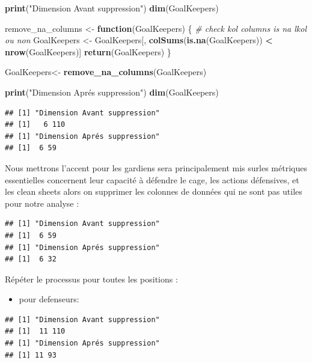 \documentclass[
  6pt,
]{article}
\newenvironment{Shaded}{\begin{snugshade}}{\end{snugshade}}
\newcommand{\CommentTok}[1]{\textcolor[rgb]{0.56,0.35,0.01}{\textit{#1}}}
\newcommand{\ControlFlowTok}[1]{\textcolor[rgb]{0.13,0.29,0.53}{\textbf{#1}}}
\newcommand{\FunctionTok}[1]{\textcolor[rgb]{0.13,0.29,0.53}{\textbf{#1}}}
\newcommand{\NormalTok}[1]{#1}
\newcommand{\OtherTok}[1]{\textcolor[rgb]{0.56,0.35,0.01}{#1}}
\newcommand{\SpecialCharTok}[1]{\textcolor[rgb]{0.81,0.36,0.00}{\textbf{#1}}}
\newcommand{\StringTok}[1]{\textcolor[rgb]{0.31,0.60,0.02}{#1}}
\providecommand{\tightlist}{%
  \setlength{\itemsep}{0pt}\setlength{\parskip}{0pt}}
\begin{document}
\begin{Shaded}
\begin{Highlighting}[]
\FunctionTok{print}\NormalTok{(}\StringTok{"Dimension Avant suppression"}\NormalTok{)}
\FunctionTok{dim}\NormalTok{(GoalKeepers)}

\NormalTok{remove\_na\_columns }\OtherTok{\textless{}{-}} \ControlFlowTok{function}\NormalTok{(GoalKeepers) \{}
  \CommentTok{\# check kol columns is na lkol ou non }
\NormalTok{  GoalKeepers }\OtherTok{\textless{}{-}}\NormalTok{ GoalKeepers[, }\FunctionTok{colSums}\NormalTok{(}\FunctionTok{is.na}\NormalTok{(GoalKeepers)) }\SpecialCharTok{\textless{}} \FunctionTok{nrow}\NormalTok{(GoalKeepers)]}
  \FunctionTok{return}\NormalTok{(GoalKeepers)}
\NormalTok{\}}


\NormalTok{GoalKeepers}\OtherTok{\textless{}{-}} \FunctionTok{remove\_na\_columns}\NormalTok{(GoalKeepers)}

\FunctionTok{print}\NormalTok{(}\StringTok{"Dimension Aprés suppression"}\NormalTok{)}
\FunctionTok{dim}\NormalTok{(GoalKeepers)}
\end{Highlighting}
\end{Shaded}

\begin{verbatim}
## [1] "Dimension Avant suppression"
## [1]   6 110
## [1] "Dimension Aprés suppression"
## [1]  6 59
\end{verbatim}

Nous mettrons l'accent pour les gardiens sera principalement mis surles
métriques essentielles concernent leur capacité à défendre le cage, les
actions défensives, et les clean sheets alors on supprimer les colonnes
de données qui ne sont pas utiles pour notre analyse :

\begin{verbatim}
## [1] "Dimension Avant suppression"
## [1]  6 59
## [1] "Dimension Aprés suppression"
## [1]  6 32
\end{verbatim}

Répéter le processus pour toutes les positions :

\begin{itemize}
\tightlist
\item
  pour defenseurs:
\end{itemize}

\begin{verbatim}
## [1] "Dimension Avant suppression"
## [1]  11 110
## [1] "Dimension Aprés suppression"
## [1] 11 93
\end{verbatim}
\end{document}
